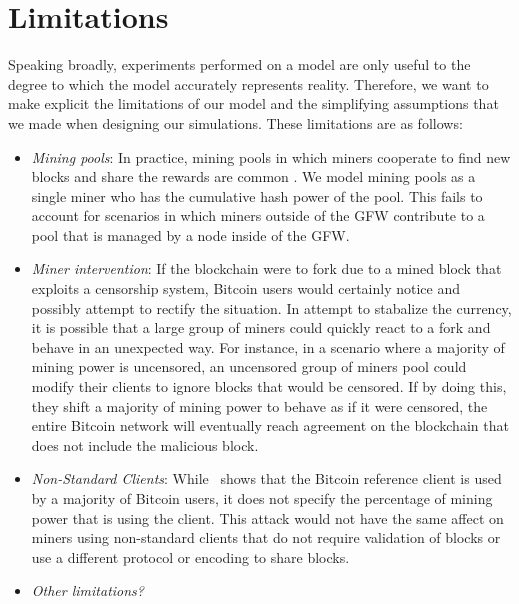 \section{Limitations}
Speaking broadly, experiments performed on a model are only useful to the degree to which the model accurately represents reality.
Therefore, we want to make explicit the limitations of our model and the simplifying assumptions that we made when designing our simulations. These limitations are as follows:


\begin{itemize}
	\item \textit{Mining pools}: In practice, mining pools in which miners cooperate to find new blocks and share the rewards are common \cite{Rosenfeld}. We model mining pools as a single miner who has the cumulative hash power of the pool. This fails to account for scenarios in which miners outside of the GFW contribute to a pool that is managed by a node inside of the GFW.
	\item \textit{Miner intervention}: If the blockchain were to fork due to a mined block that exploits a censorship system, Bitcoin users would certainly notice and possibly attempt to rectify the situation.
In attempt to stabalize the currency, it is possible that a large group of miners could quickly react to a fork and behave in an unexpected way. For instance, in a scenario where a majority of mining power is uncensored, an uncensored group of miners pool could modify their clients to ignore blocks that would be censored. If by doing this, they shift a majority of mining power to behave as if it were censored, the entire Bitcoin network will eventually reach agreement on the blockchain that does not include the malicious block.
	\item \textit{Non-Standard Clients}: While~\cite{shadow-bitcoin} shows that the Bitcoin reference client is used by a majority of Bitcoin users, it does not specify the percentage of mining power that is using the client. This attack would not have the same affect on miners using non-standard clients that do not require validation of blocks or use a different protocol or encoding to share blocks.

	\item \textit{Other limitations?} %
\end{itemize}


